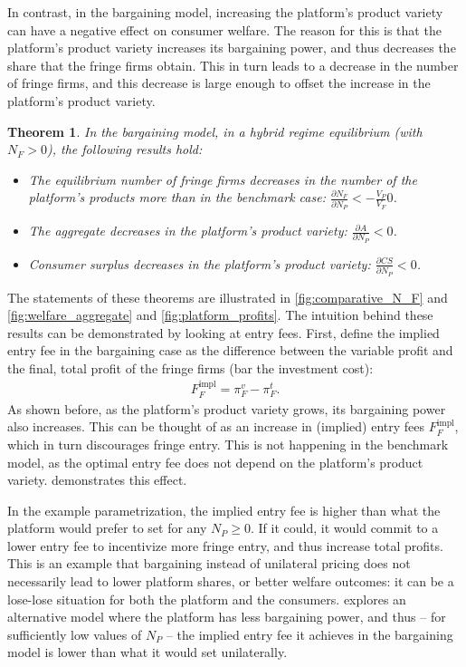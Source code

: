 \documentclass[a4paper]{article}
\newtheorem{theorem}{Theorem}
\begin{document}
In contrast, in the bargaining model, increasing the platform's product variety can have a negative effect on consumer welfare.
The reason for this is that the platform's product variety increases its bargaining power, and thus decreases the share that the fringe firms obtain.
This in turn leads to a decrease in the number of fringe firms, and this decrease is large enough to offset the increase in the platform's product variety.
\begin{theorem}
    In the bargaining model, in a hybrid regime equilibrium (with $N_F > 0$), the following results hold:
    \begin{itemize}
        \item The equilibrium number of fringe firms decreases in the number of the platform's products more than in the benchmark case: $\frac{\partial N_F}{\partial N_P} < -\frac{V_P}{V_F} 0$.
        \item The aggregate decreases in the platform's product variety: $\frac{\partial A}{\partial N_P} < 0$.
        \item Consumer surplus decreases in the platform's product variety: $\frac{\partial CS}{\partial N_P} < 0$.
    \end{itemize}
\end{theorem}

The statements of these theorems are illustrated in \cref{fig:comparative_N_F} and \cref{fig:welfare_aggregate} and \cref{fig:platform_profits}.
The intuition behind these results can be demonstrated by looking at entry fees.
First, define the implied entry fee in the bargaining case as the difference between the variable profit and the final, total profit of the fringe firms (bar the investment cost):
\begin{align*}
    F_F^{\text{impl}} = \pi_F^v - \pi_F^t.
\end{align*}
As shown before, as the platform's product variety grows, its bargaining power also increases.
This can be thought of as an increase in (implied) entry fees $F_F^{\text{impl}}$, which in turn discourages fringe entry.
This is not happening in the benchmark model, as the optimal entry fee does not depend on the platform's product variety.
 demonstrates this effect.

In the example parametrization, the implied entry fee is higher than what the platform would prefer to set for any $N_P \geq 0$.
If it could, it would commit to a lower entry fee to incentivize more fringe entry, and thus increase total profits.
This is an example that bargaining instead of unilateral pricing does not necessarily lead to lower platform shares, or better welfare outcomes: it can be a lose-lose situation for both the platform and the consumers.
 explores an alternative model where the platform has less bargaining power, and thus -- for sufficiently low values of $N_P$ -- the implied entry fee it achieves in the bargaining model is lower than what it would set unilaterally.
\end{document}
